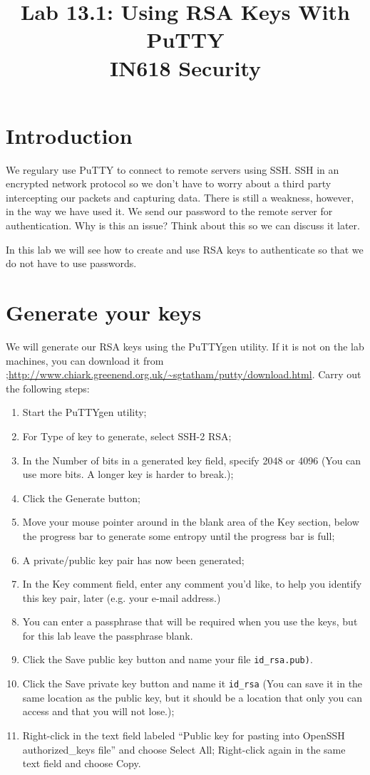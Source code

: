 \documentclass{article}
\begin{document}
\title{ Lab 13.1: Using RSA Keys With PuTTY \\ IN618 Security}
\maketitle

\section*{Introduction}
We regulary use PuTTY to connect to remote servers using SSH. SSH in an encrypted network protocol so we don't have to worry about a third party intercepting our packets and capturing data.  There is still a weakness, however, in the way we have used it. We send our password to the remote server for authentication.  Why is this an issue? Think about this so we can discuss it later.

In this lab we will see how to create and use RSA keys to authenticate so that we do not have to use passwords.

\section{Generate your keys}
We will generate our RSA keys using the PuTTYgen utility.  If it is not on the lab machines, you can download it from \url{;http://www.chiark.greenend.org.uk/~sgtatham/putty/download.html}. Carry out the following steps:

\begin{enumerate}
  \item Start the PuTTYgen utility;
  \item For Type of key to generate, select SSH-2 RSA;
  \item In the Number of bits in a generated key field, specify 2048 or 4096 (You can use more bits. A longer key is harder to break.);
  \item Click the Generate button;
  \item Move your mouse pointer around in the blank area of the Key section, below the progress bar to generate some entropy until the progress bar is full;
  \item A private/public key pair has now been generated;
  \item In the Key comment field, enter any comment you'd like, to help you identify this key pair, later (e.g. your e-mail address.) 
  \item You can enter a passphrase that will be required when you use the keys, but for this lab leave the passphrase blank.
  \item Click the Save public key button and name your file \texttt{id\_rsa.pub)}. 
  \item Click the Save private key button and name it \texttt{id\_rsa} (You can save it in the same location as the public key, but it should be a location that only you can access and that you will not lose.);
  \item Right-click in the text field labeled ``Public key for pasting into OpenSSH authorized\_keys file'' and choose Select All; Right-click again in the same text field and choose Copy.
\end{enumerate}
\end{document}
